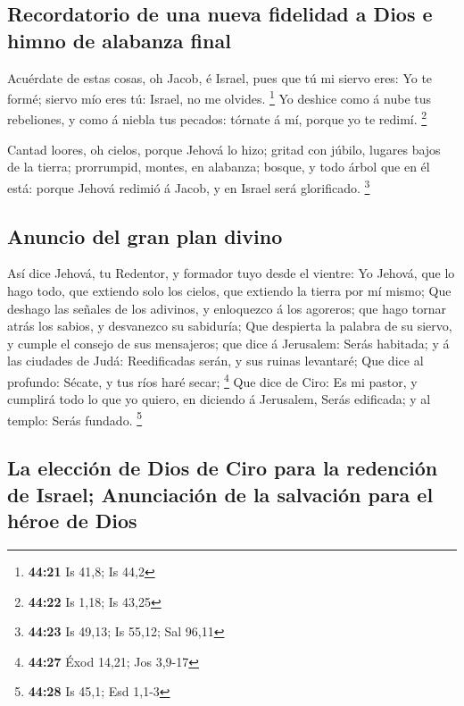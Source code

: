 \hypertarget{recordatorio-de-una-nueva-fidelidad-a-dios-e-himno-de-alabanza-final}{%
\subsection{Recordatorio de una nueva fidelidad a Dios e himno de
alabanza
final}\label{recordatorio-de-una-nueva-fidelidad-a-dios-e-himno-de-alabanza-final}}

 Acuérdate de estas cosas, oh Jacob, é Israel, pues que tú
mi siervo eres: Yo te formé; siervo mío eres tú: Israel, no me olvides.
\footnote{\textbf{44:21} Is 41,8; Is 44,2}  Yo deshice como
á nube tus rebeliones, y como á niebla tus pecados: tórnate á mí, porque
yo te redimí. \footnote{\textbf{44:22} Is 1,18; Is 43,25}

 Cantad loores, oh cielos, porque Jehová lo hizo; gritad
con júbilo, lugares bajos de la tierra; prorrumpid, montes, en alabanza;
bosque, y todo árbol que en él está: porque Jehová redimió á Jacob, y en
Israel será glorificado. \footnote{\textbf{44:23} Is 49,13; Is 55,12;
  Sal 96,11}

\hypertarget{anuncio-del-gran-plan-divino}{%
\subsection{Anuncio del gran plan
divino}\label{anuncio-del-gran-plan-divino}}

 Así dice Jehová, tu Redentor, y formador tuyo desde el
vientre: Yo Jehová, que lo hago todo, que extiendo solo los cielos, que
extiendo la tierra por mí mismo;  Que deshago las señales
de los adivinos, y enloquezco á los agoreros; que hago tornar atrás los
sabios, y desvanezco su sabiduría;  Que despierta la
palabra de su siervo, y cumple el consejo de sus mensajeros; que dice á
Jerusalem: Serás habitada; y á las ciudades de Judá: Reedificadas serán,
y sus ruinas levantaré;  Que dice al profundo: Sécate, y
tus ríos haré secar; \footnote{\textbf{44:27} Éxod 14,21; Jos 3,9-17}
 Que dice de Ciro: Es mi pastor, y cumplirá todo lo que yo
quiero, en diciendo á Jerusalem, Serás edificada; y al templo: Serás
fundado. \footnote{\textbf{44:28} Is 45,1; Esd 1,1-3}

\hypertarget{la-elecciuxf3n-de-dios-de-ciro-para-la-redenciuxf3n-de-israel-anunciaciuxf3n-de-la-salvaciuxf3n-para-el-huxe9roe-de-dios}{%
\subsection{La elección de Dios de Ciro para la redención de Israel;
Anunciación de la salvación para el héroe de
Dios}\label{la-elecciuxf3n-de-dios-de-ciro-para-la-redenciuxf3n-de-israel-anunciaciuxf3n-de-la-salvaciuxf3n-para-el-huxe9roe-de-dios}}

